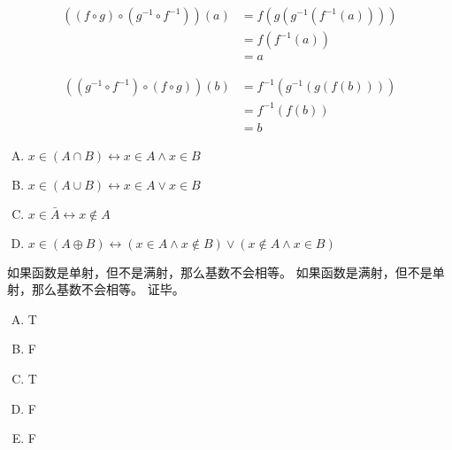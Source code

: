 {{        %
        \begin{practices}
            \begin{align*}
                ((f \circ g) \circ (g^{-1} \circ f^{-1}))(a)
                &= f(g(g^{-1}(f^{-1}(a)))) \\
                &= f(f^{-1}(a)) \\
                &= a
            \end{align*}

            \begin{align*}
                ((g^{-1} \circ f^{-1}) \circ (f \circ g))(b)
                &= f^{-1}(g^{-1}(g(f(b)))) \\
                &= f^{-1}(f(b)) \\
                &= b
            \end{align*}
        \end{practices}

        \begin{practices}
            \begin{enumerate}[A.]
                \item $x \in (A \cap B) \leftrightarrow x \in A \wedge x \in B$
                \item $x \in (A \cup B) \leftrightarrow x \in A \vee x \in B$
                \item $x \in \bar{A} \leftrightarrow x \notin A$
                \item $x \in (A \oplus B) \leftrightarrow (x \in A \wedge x \notin B) \vee (x \notin A \wedge x \in B)$
            \end{enumerate}
        \end{practices}

        \begin{practices}
            如果函数是单射，但不是满射，那么基数不会相等。
            如果函数是满射，但不是单射，那么基数不会相等。
            证毕。
        \end{practices}

        \begin{practices}
            \begin{enumerate}[A.]
                \item T
                \item F
                \item T
                \item F
                \item F
            \end{enumerate}
        \end{practices}

}}
